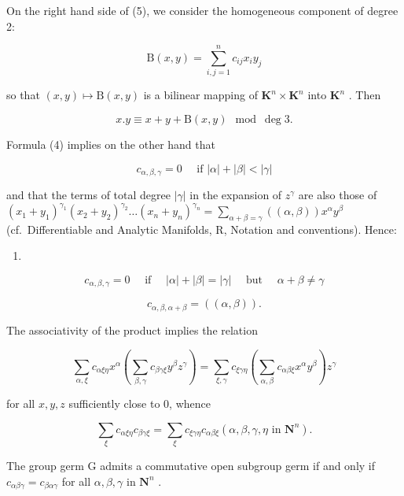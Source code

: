 On the right hand side of (5), we consider the homogeneous component of degree 2:

\[
\mathrm{B} (x, y) = \sum_ {i, j = 1} ^ {n} c _ {i j} x _ {i} y _ {j}
\]

so that \((x,y)\mapsto \mathrm{B}(x,y)\) is a bilinear mapping of \(\mathbf{K}^n\times \mathbf{K}^n\) into \(\mathbf{K}^n\) . Then

\[
x. y \equiv x + y + \mathrm{B} (x, y) \mod \deg 3.\tag{6}
\]

Formula (4) implies on the other hand that

\[
c _ {\alpha , \beta , \gamma} = 0 \quad \text { if } | \alpha | + | \beta | <   | \gamma |\tag{7}
\]

and that the terms of total degree \(|\gamma|\) in the expansion of \(z^\gamma\) are also those of \((x_1 + y_1)^{\gamma_1}(x_2 + y_2)^{\gamma_2} \ldots (x_n + y_n)^{\gamma_n} = \sum_{\alpha + \beta = \gamma} ((\alpha, \beta)) x^\alpha y^\beta\) (cf.~Differentiable and Analytic Manifolds, R, Notation and conventions). Hence:

\begin{enumerate}
\def\labelenumi{(\arabic{enumi})}
\setcounter{enumi}{7}
\tightlist
\item
\end{enumerate}

\[
c _ {\alpha , \beta , \gamma} = 0 \quad \text { if } \quad | \alpha | + | \beta | = | \gamma | \quad \text { but } \quad \alpha + \beta \neq \gamma\tag{8}
\]

\[
c _ {\alpha , \beta , \alpha + \beta} = ((\alpha , \beta)).\tag{9}
\]

The associativity of the product implies the relation

\[
\sum_ {\alpha , \xi} c _ {\alpha \xi \eta} x ^ {\alpha} \left(\sum_ {\beta , \gamma} c _ {\beta \gamma \xi} y ^ {\beta} z ^ {\gamma}\right) = \sum_ {\xi , \gamma} c _ {\xi \gamma \eta} \left(\sum_ {\alpha , \beta} c _ {\alpha \beta \xi} x ^ {\alpha} y ^ {\beta}\right) z ^ {\gamma}
\]

for all \(x, y, z\) sufficiently close to 0, whence

\[
\sum_ {\xi} c _ {\alpha \xi \eta} c _ {\beta \gamma \xi} = \sum_ {\xi} c _ {\xi \gamma \eta} c _ {\alpha \beta \xi} (\alpha , \beta , \gamma , \eta \text { in } \mathbf {N} ^ {n}).\tag{10}
\]

The group germ G admits a commutative open subgroup germ if and only if \(c_{\alpha\beta\gamma} = c_{\beta\alpha\gamma}\) for all \(\alpha, \beta, \gamma\) in \(\mathbf{N}^{n}\) .

